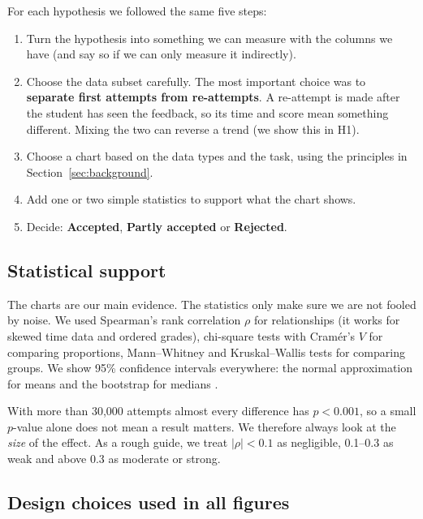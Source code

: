 \documentclass[11pt,a4paper]{article}
\newcommand{\accepted}{\textcolor{okgreen}{\textbf{Accepted}}}
\newcommand{\partly}{\textcolor{partly}{\textbf{Partly accepted}}}
\newcommand{\rejected}{\textcolor{nored}{\textbf{Rejected}}}
\begin{document}
For each hypothesis we followed the same five steps:
\begin{enumerate}
  \item Turn the hypothesis into something we can measure with the columns we
        have (and say so if we can only measure it indirectly).
  \item Choose the data subset carefully. The most important choice was to
        \textbf{separate first attempts from re-attempts}. A re-attempt is made
        after the student has seen the feedback, so its time and score mean
        something different. Mixing the two can reverse a trend (we show this
        in H1).
  \item Choose a chart based on the data types and the task, using the
        principles in Section~\ref{sec:background}.
  \item Add one or two simple statistics to support what the chart shows.
  \item Decide: \accepted, \partly{} or \rejected.
\end{enumerate}

\subsection{Statistical support}

The charts are our main evidence. The statistics only make sure we are not
fooled by noise. We used Spearman's rank correlation $\rho$ for relationships
(it works for skewed time data and ordered grades), chi-square tests with
Cram\'er's $V$ for comparing proportions, Mann--Whitney and Kruskal--Wallis
tests for comparing groups. We show 95\% confidence intervals everywhere: the
normal approximation for means and the bootstrap for medians
\citep{efron1993bootstrap}.

With more than 30,000 attempts almost every difference has $p < 0.001$, so a
small $p$-value alone does not mean a result matters. We therefore always look
at the \emph{size} of the effect. As a rough guide, we treat $|\rho| < 0.1$ as
negligible, 0.1--0.3 as weak and above 0.3 as moderate or strong.

\subsection{Design choices used in all figures}
\label{sec:design}
\end{document}
